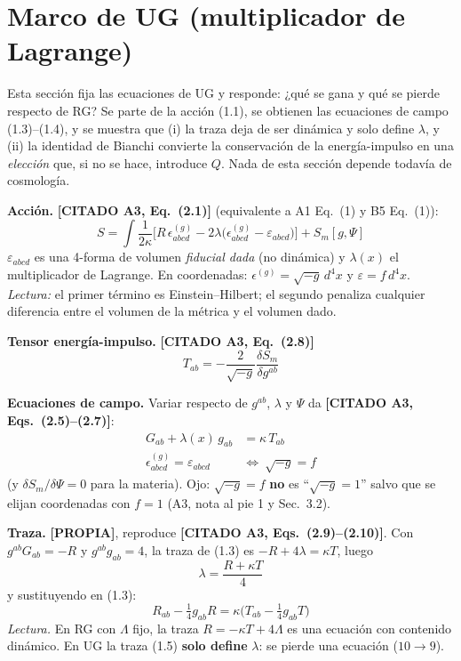 \documentclass[11pt,a4paper]{article}
\newcommand{\propia}{{\bfseries\color{TealBlue}[PROPIA]}}
\newcommand{\citado}[1]{{\bfseries\color{RoyalBlue}[CITADO #1]}}
\newcommand{\sub}[2]{\par\medskip\noindent{\bfseries\color{NavyBlue}#1}\quad\textbf{#2}}
\begin{document}
\section{Marco de UG (multiplicador de Lagrange)}

\begin{enpalabras}
Esta sección fija las ecuaciones de UG y responde: ¿qué se gana y qué se pierde respecto de RG? Se parte de la acción (1.1), se obtienen las ecuaciones de campo (1.3)--(1.4), y se muestra que (i) la traza deja de ser dinámica y solo define $\lambda$, y (ii) la identidad de Bianchi convierte la conservación de la energía-impulso en una \emph{elección} que, si no se hace, introduce $Q$. Nada de esta sección depende todavía de cosmología.
\end{enpalabras}

\sub{1.1}{Acción.} \citado{A3, Eq.~(2.1)} (equivalente a A1 Eq.~(1) y B5 Eq.~(1)):
\begin{equation}
S=\int\frac1{2\kappa}\Big[R\,\epsilon^{(g)}_{abcd}-2\lambda\big(\epsilon^{(g)}_{abcd}-\varepsilon_{abcd}\big)\Big]+S_m[g,\Psi]\tag{1.1}
\end{equation}
$\varepsilon_{abcd}$ es una 4-forma de volumen \emph{fiducial dada} (no dinámica) y $\lambda(x)$ el multiplicador de Lagrange. En coordenadas: $\epsilon^{(g)}=\sqrt{-g}\,d^4x$ y $\varepsilon=f\,d^4x$. \emph{Lectura:} el primer término es Einstein--Hilbert; el segundo penaliza cualquier diferencia entre el volumen de la métrica y el volumen dado.

\sub{1.2}{Tensor energía-impulso.} \citado{A3, Eq.~(2.8)}
\begin{equation}
T_{ab}=-\frac2{\sqrt{-g}}\frac{\delta S_m}{\delta g^{ab}}\tag{1.2}
\end{equation}

\sub{1.3}{Ecuaciones de campo.} Variar respecto de $g^{ab}$, $\lambda$ y $\Psi$ da \citado{A3, Eqs.~(2.5)--(2.7)}:
\begin{align}
G_{ab}+\lambda(x)\,g_{ab}&=\kappa\,T_{ab}\tag{1.3}\\
\epsilon^{(g)}_{abcd}=\varepsilon_{abcd}\ &\Longleftrightarrow\ \sqrt{-g}=f\tag{1.4}
\end{align}
(y $\delta S_m/\delta\Psi=0$ para la materia). Ojo: $\sqrt{-g}=f$ \textbf{no} es ``$\sqrt{-g}=1$'' salvo que se elijan coordenadas con $f=1$ (A3, nota al pie 1 y Sec.~3.2).

\sub{1.4}{Traza.} \propia, reproduce \citado{A3, Eqs.~(2.9)--(2.10)}. Con $g^{ab}G_{ab}=-R$ y $g^{ab}g_{ab}=4$, la traza de (1.3) es $-R+4\lambda=\kappa T$, luego
\begin{equation}
\lambda=\frac{R+\kappa T}4\tag{1.5}
\end{equation}
y sustituyendo en (1.3):
\begin{equation}
R_{ab}-\tfrac14g_{ab}R=\kappa\big(T_{ab}-\tfrac14g_{ab}T\big)\tag{1.6}
\end{equation}
\emph{Lectura.} En RG con $\Lambda$ fijo, la traza $R=-\kappa T+4\Lambda$ es una ecuación con contenido dinámico. En UG la traza (1.5) \textbf{solo define} $\lambda$: se pierde una ecuación ($10\to9$).
\end{document}
